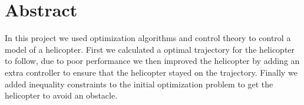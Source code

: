
\section{Abstract}

In this project we used optimization algorithms and control theory to control a model of a helicopter. First we calculated a optimal trajectory for the helicopter to follow, due to poor performance we then improved the helicopter by adding an extra controller to ensure that the helicopter stayed on the trajectory. Finally we added inequality constraints to the initial optimization problem to get the helicopter to avoid an obstacle. 
